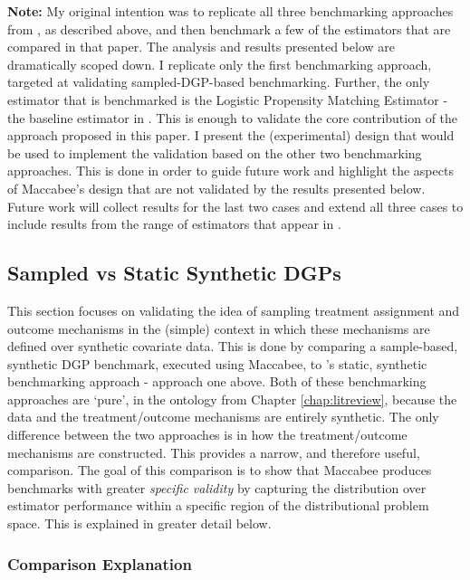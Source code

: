 \documentclass[../main.tex]{subfiles}
\begin{document}
\vspace{\baselineskip}

\textbf{Note:} My original intention was to replicate all three benchmarking approaches from \textcite{Diamond2013GeneticStudies}, as described above, and then benchmark a few of the estimators that are compared in that paper. The analysis and results presented below are dramatically scoped down. I replicate only the first benchmarking approach, targeted at validating sampled-DGP-based benchmarking. Further, the only estimator that is benchmarked is the Logistic Propensity Matching Estimator - the baseline estimator in \textcite{Diamond2013GeneticStudies}. This is enough to validate the core contribution of the approach proposed in this paper. I present the (experimental) design that would be used to implement the validation based on the other two benchmarking approaches. This is done in order to guide future work and highlight the aspects of Maccabee's design that are not validated by the results presented below. Future work will collect results for the last two cases and extend all three cases to include results from the range of estimators that appear in \textcite{Diamond2013GeneticStudies}.

\subsection{Sampled vs Static Synthetic DGPs}
\label{sec:comparison-1}

This section focuses on validating the idea of sampling treatment assignment and outcome mechanisms in the (simple) context in which these mechanisms are defined over synthetic covariate data. This is done by comparing a sample-based, synthetic DGP benchmark, executed using Maccabee, to \citeauthor{Diamond2013GeneticStudies}'s static, synthetic benchmarking approach - approach one above. Both of these benchmarking approaches are `pure', in the ontology from Chapter \ref{chap:litreview}, because the data and the treatment/outcome mechanisms are entirely synthetic. The only difference between the two approaches is in how the treatment/outcome mechanisms are constructed. This provides a narrow, and therefore useful, comparison. The goal of this comparison is to show that Maccabee produces benchmarks with greater \textit{specific validity} by capturing the distribution over estimator performance within a specific region of the distributional problem space. This is explained in greater detail below.

\subsubsection{Comparison Explanation}
\end{document}

